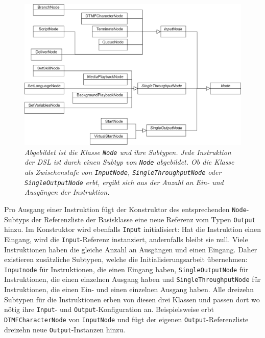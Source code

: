 \begin{figure} %
	\centering
		\includegraphics[width=\textwidth]{img/NodeHierarchy.png}
	\caption[Klassenhierarchie der Klasse \texttt{Node}]{\textit{Abgebildet ist die Klasse \texttt{Node} und ihre Subtypen. Jede Instruktion der DSL ist durch einen Subtyp von \texttt{Node} abgebildet. Ob die Klasse als Zwischenstufe von \texttt{InputNode}, \texttt{SingleThroughputNode} oder \texttt{SingleOutputNode} erbt, ergibt sich aus der Anzahl an Ein- und Ausgängen der Instruktion.}}
	\label{fig:UML:Node-Hierarchy}
\end{figure}
\noindent Pro Ausgang einer Instruktion fügt der Konstruktor des entsprechenden \texttt{Node}-Subtyps der Referenzliste der Basisklasse eine neue Referenz vom Typen \texttt{Output} hinzu. Im Konstruktor wird ebenfalls \texttt{Input} initialisiert: Hat die Instruktion einen Eingang, wird die \texttt{Input}-Referenz instanziert, andernfalls bleibt sie null. Viele Instruktionen haben die gleiche Anzahl an Ausgängen und einen Eingang. Daher existieren zusätzliche Subtypen, welche die Initialisierungsarbeit übernehmen: \texttt{Inputnode} für Instruktionen, die einen Eingang haben, \texttt{SingleOutputNode} für Instruktionen, die einen einzelnen Ausgang haben und \texttt{SingleThroughputNode} für Instruktionen, die einen Ein- und einen einzelnen Ausgang haben. Alle dreizehn Subtypen für die Instruktionen erben von diesen drei Klassen und passen dort wo nötig ihre \texttt{Input}- und \texttt{Output}-Konfiguration an. Beispielsweise erbt \texttt{DTMFCharacterNode} von \texttt{InputNode} und fügt der eigenen \texttt{Output}-Referenzliste dreizehn neue \texttt{Output}-Instanzen hinzu.
\newline
